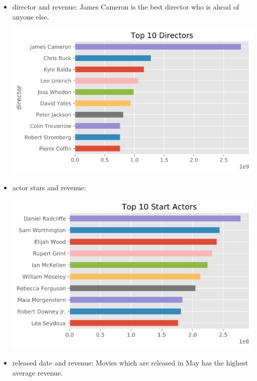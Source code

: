 \documentclass[UTF8]{article}
\begin{document}
\begin{itemize}
\begin{itemize}
\begin{center}
                    \end{center}
              \item director and revenue: James Cameron is the best director who is ahead of anyone else.
                    \begin{center}
                        \includegraphics[scale=0.5]{Img/director.png}
                    \end{center}
              \item actor stars and revenue:
                    \begin{center}
                        \includegraphics[scale=0.5]{Img/stars.png}
                    \end{center}
              \item released date and revenue: Movies which are released in May has the highest average revenue.
                    \begin{center}

\end{center}
\end{itemize}
\end{itemize}
\end{document}
